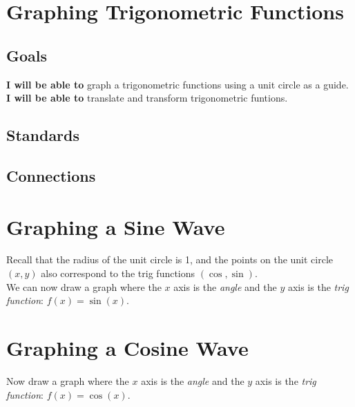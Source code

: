 \documentclass[12pt]{article}
\begin{document}
\section{Graphing Trigonometric Functions}

\subsection{Goals}

\textbf{I will be able to} graph a trigonometric functions using a unit circle as a guide.\\

\textbf{I will be able to} translate and transform trigonometric funtions.\\

\subsection{Standards}

\subsection{Connections}

\clearpage

\section*{Graphing a Sine Wave}

Recall that the radius of the unit circle is 1, and the points on the unit circle $(x,y)$ also correspond to the trig functions $(\cos, \sin)$. \\

We can now draw a graph where the $x$ axis is the \emph{angle} and the $y$ axis is the \emph{trig function}: $f(x)=\sin(x)$.\\

\section*{Graphing a Cosine Wave}

Now draw a graph where the $x$ axis is the \emph{angle} and the $y$ axis is the \emph{trig function}: $f(x)=\cos(x)$.\\
\end{document}
